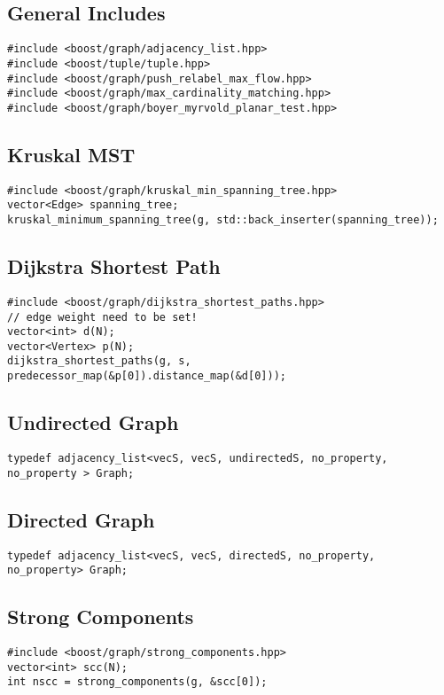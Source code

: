 \documentclass[11pt]{article}
\begin{document}
\subsection{General Includes}
\begin{lstlisting}
#include <boost/graph/adjacency_list.hpp>
#include <boost/tuple/tuple.hpp>
#include <boost/graph/push_relabel_max_flow.hpp>
#include <boost/graph/max_cardinality_matching.hpp>
#include <boost/graph/boyer_myrvold_planar_test.hpp>
\end{lstlisting}

\subsection{Kruskal MST}
\begin{lstlisting}
#include <boost/graph/kruskal_min_spanning_tree.hpp>
vector<Edge> spanning_tree;
kruskal_minimum_spanning_tree(g, std::back_inserter(spanning_tree));
\end{lstlisting}

\subsection{Dijkstra Shortest Path}
\begin{lstlisting}
#include <boost/graph/dijkstra_shortest_paths.hpp>
// edge weight need to be set!
vector<int> d(N);
vector<Vertex> p(N);
dijkstra_shortest_paths(g, s, predecessor_map(&p[0]).distance_map(&d[0]));
\end{lstlisting}

\subsection{Undirected Graph}
\begin{lstlisting}
typedef adjacency_list<vecS, vecS, undirectedS, no_property, no_property > Graph;
\end{lstlisting}

\subsection{Directed Graph}
\begin{lstlisting}
typedef adjacency_list<vecS, vecS, directedS, no_property, no_property> Graph;
\end{lstlisting}

\subsection{Strong Components}
\begin{lstlisting}
#include <boost/graph/strong_components.hpp>
vector<int> scc(N);
int nscc = strong_components(g, &scc[0]);
\end{lstlisting}
\end{document}
